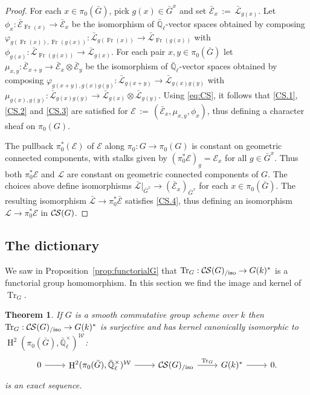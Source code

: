 \documentclass[10pt]{amsart}
\theoremstyle{plain}
\newtheorem{theorem}{Theorem}[section]
\theoremstyle{definition}
\newcommand{\EE}{\mathbb{\bar Q}_\ell}
\newcommand{\Fq}{k}
\newcommand{\EEx}{\EE^\times}
\newcommand{\Weil}[1]{\mathcal{W}_{#1}}
\newcommand{\Frob}[1]{\operatorname{Fr}_{#1}}
\DeclareMathOperator{\Hh}{H}
\newcommand{\ceq}{{\, :=\, }}
\newcommand{\TrFrob}[1]{\operatorname{Tr}_{#1}}
\newcommand{\cs}[1]{{\mathcal{#1}}}
\newcommand{\gcs}[1]{{\mathcal{\bar #1}}}
\newcommand{\CS}{{\mathcal{C\hskip-0.8pt S}}}
\newcommand{\CSiso}[1]{\CS(#1)_{/\text{iso}}}
\newcommand{\bG}{\bar{G}}
\begin{document}
\begin{proof}
For each $x\in \pi_0(\bG)$, pick $g(x)\in \bG^x$
and set $\gcs{E}_x \ceq \gcs{L}_{g(x)}$.
Let $\phi_x : \gcs{E}_{\Frob{}(x)} \to \gcs{E}_x$
be the isomorphism of $\EE$-vector spaces obtained by composing
$\varphi_{g(\Frob{}(x)),\Frob{}(g(x))} : \gcs{L}_{g(\Frob{}(x))} \to \gcs{L}_{\Frob{}(g(x))}$
with $\phi_{g(x)} : \gcs{L}_{\Frob{}(g(x))} \to \gcs{L}_{g(x)}$.
For each pair $x,y\in \pi_0(\bG)$
let $\mu_{x,y} : \gcs{E}_{x+y}\to \gcs{E}_x\otimes \gcs{E}_y$
be the isomorphism of $\EE$-vector spaces obtained by composing
$\varphi_{g(x+y),g(x)g(y)} : \gcs{L}_{g(x+y)} \to \gcs{L}_{g(x)g(y)}$
with $\mu_{g(x),g(y)} : \gcs{L}_{g(x)g(y)} \to \gcs{L}_{g(x)}\otimes \gcs{L}_{g(y)}$.
Using \eqref{eq:CS}, it follows that \ref{CS.1}, \ref{CS.2} and \ref{CS.3} are satisfied for
$\cs{E} \ceq (\gcs{E}_x, \mu_{x,y}, \phi_x)$, thus defining a character sheaf on $\pi_0(G)$.

The pullback $\pi_0^*(\cs{E})$ of $\cs{E}$ along $\pi_0 : G \to \pi_0(G)$ is constant
on geometric connected components, with stalks given by
$(\pi_0^* \cs{E})_g = \cs{E}_{x}$ for all $g\in \bG^x$.  Thus both $\pi_0^*\cs{E}$ and $\cs{L}$
are constant on geometric connected components of $G$.
The choices above define isomorphisms
$\gcs{L}\vert_{\bG^x} \to  (\gcs{E}_{x})_{\bG^x}$ for each $x\in \pi_0(\bG)$.
The resulting isomorphism $\gcs{L} \to \pi_0^* \gcs{E}$ satisfies \ref{CS.4},
thus defining an isomorphism $\cs{L} \to \pi_0^* \cs{E}$ in $\CS(G)$.
\end{proof}

\subsection{The dictionary}
\label{ssec:snake}

We saw in Proposition~\ref{prop:functorialG} that $\TrFrob{G} : \CSiso{G} \to G(\Fq)^*$ is a functorial group homomorphism.
In this section we find the image and kernel of $\TrFrob{G}$.

\begin{theorem}\label{thm:snake}
  If $G$ is a smooth commutative group scheme over $\Fq$ then
  $\TrFrob{G} : \CSiso{G} \to G(\Fq)^*$ is surjective and has kernel canonically isomorphic to $\Hh^2(\pi_0(\bG),\EEx)^{\Weil{}}$:
    \[
  \begin{tikzcd}
0 \arrow{r} & \Hh^2(\pi_0(\bG),\EEx)^{\Weil{}} \arrow{r} & \CSiso{G} \arrow{r}{\TrFrob{G}} & G(\Fq)^* \arrow{r} & 0. 
  \end{tikzcd}
\]
is an exact sequence.
\end{theorem}
\end{document}
